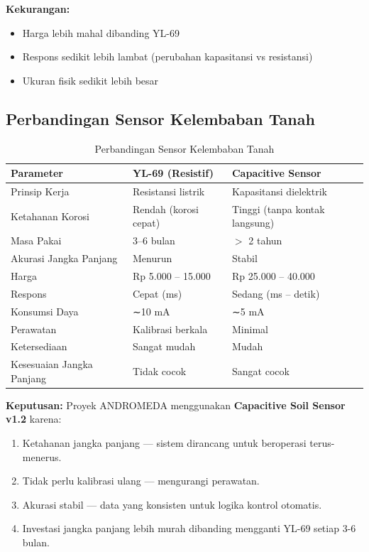 \documentclass[12pt,a4paper,oneside]{report}
\begin{document}
\textbf{Kekurangan:}
\begin{itemize}
    \item Harga lebih mahal dibanding YL-69
    \item Respons sedikit lebih lambat (perubahan kapasitansi vs resistansi)
    \item Ukuran fisik sedikit lebih besar
\end{itemize}

\subsection{Perbandingan Sensor Kelembaban Tanah}

\begin{table}[H]
\centering
\caption{Perbandingan Sensor Kelembaban Tanah}
\label{tab:sensor-compare}
\begin{tabular}{p{3.5cm} p{5cm} p{5cm}}
\toprule
\textbf{Parameter} & \textbf{YL-69 (Resistif)} & \textbf{Capacitive Sensor} \\
\midrule
Prinsip Kerja & Resistansi listrik & Kapasitansi dielektrik \\
Ketahanan Korosi & Rendah (korosi cepat) & Tinggi (tanpa kontak langsung) \\
Masa Pakai & 3--6 bulan & $>$ 2 tahun \\
Akurasi Jangka Panjang & Menurun & Stabil \\
Harga & Rp 5.000 -- 15.000 & Rp 25.000 -- 40.000 \\
Respons & Cepat (ms) & Sedang (ms -- detik) \\
Konsumsi Daya & ∼10 mA & ∼5 mA \\
Perawatan & Kalibrasi berkala & Minimal \\
Ketersediaan & Sangat mudah & Mudah \\
Kesesuaian Jangka Panjang & Tidak cocok & Sangat cocok \\
\bottomrule
\end{tabular}
\end{table}

\textbf{Keputusan:} Proyek ANDROMEDA menggunakan \textbf{Capacitive Soil Sensor v1.2} karena:
\begin{enumerate}
    \item Ketahanan jangka panjang — sistem dirancang untuk beroperasi terus-menerus.
    \item Tidak perlu kalibrasi ulang — mengurangi perawatan.
    \item Akurasi stabil — data yang konsisten untuk logika kontrol otomatis.
    \item Investasi jangka panjang lebih murah dibanding mengganti YL-69 setiap 3-6 bulan.
\end{enumerate}
\end{document}
